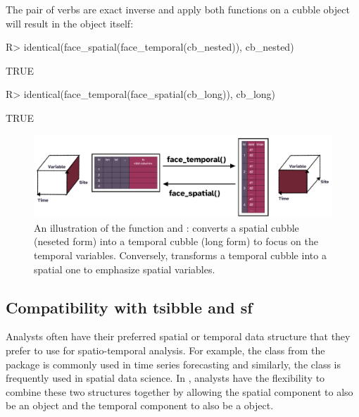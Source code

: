 \documentclass[
  shortnames]{jss}
\begin{document}
The pair of verbs are exact inverse and apply both functions on a cubble object will result in the object itself:

\begin{CodeChunk}
\begin{CodeInput}
R> identical(face_spatial(face_temporal(cb_nested)), cb_nested)
\end{CodeInput}
\begin{CodeOutput}
[1] TRUE
\end{CodeOutput}
\begin{CodeInput}
R> identical(face_temporal(face_spatial(cb_long)), cb_long)
\end{CodeInput}
\begin{CodeOutput}
[1] TRUE
\end{CodeOutput}
\end{CodeChunk}

\begin{CodeChunk}
\begin{figure}

{\centering \includegraphics[width=1\linewidth]{figures/diagram-keynotes/diagram-keynotes.001} 

}

\caption{An illustration of the function  and :  converts a spatial cubble (neseted form) into a temporal cubble (long form) to focus on the temporal variables. Conversely,  transforms a temporal cubble into a spatial one to emphasize spatial variables.}\label{fig:face}
\end{figure}
\end{CodeChunk}

\hypertarget{compatibility-with-tsibble-and-sf}{%
\subsection{Compatibility with tsibble and sf}\label{compatibility-with-tsibble-and-sf}}

Analysts often have their preferred spatial or temporal data structure that they prefer to use for spatio-temporal analysis. For example, the  class from the  package \citep{tsibble} is commonly used in time series forecasting and similarly, the  class \citep{sf} is frequently used in spatial data science. In , analysts have the flexibility to combine these two structures together by allowing the spatial component to also be an  object and the temporal component to also be a  object.
\end{document}
